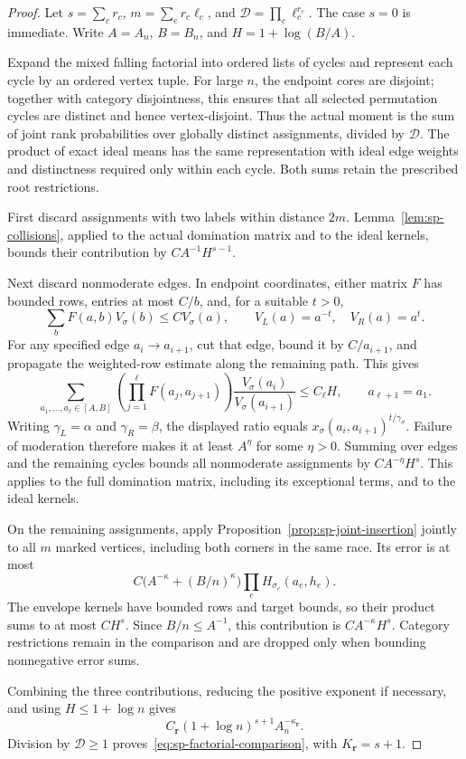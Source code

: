 \documentclass[11pt]{article}
\theoremstyle{remark}
\theoremstyle{plain}
\begin{document}
\begin{proof}
Let $s=\sum_c r_c$, $m=\sum_c r_c\ell_c$, and
$\mathcal D=\prod_c\ell_c^{r_c}$.  The case $s=0$ is immediate.
Write $A=A_n$, $B=B_n$, and $H=1+\log(B/A)$.

Expand the mixed falling factorial into ordered lists of cycles and
represent each cycle by an ordered vertex tuple.  For large $n$,
the endpoint cores are disjoint; together with category disjointness,
this ensures that all selected permutation cycles are distinct and
hence vertex-disjoint.  Thus the actual moment is the sum of joint
rank probabilities over globally distinct assignments, divided by
$\mathcal D$.  The product of exact ideal means has the same
representation with ideal edge weights and distinctness required
only within each cycle.  Both sums retain the prescribed root
restrictions.

First discard assignments with two labels within distance $2m$.
Lemma~\ref{lem:sp-collisions}, applied to the actual domination matrix
and to the ideal kernels, bounds their contribution by
$CA^{-1}H^{s-1}$.

Next discard nonmoderate edges.  In endpoint coordinates, either
matrix $F$ has bounded rows, entries at most $C/b$, and, for a
suitable $t>0$,
\[
 \sum_b F(a,b)V_\sigma(b)\le CV_\sigma(a),
 \qquad
 V_L(a)=a^{-t},\quad V_R(a)=a^t.
\]
For any specified edge $a_i\to a_{i+1}$, cut that edge, bound it by
$C/a_{i+1}$, and propagate the weighted-row estimate along the
remaining path.  This gives
\[
 \sum_{a_1,\ldots,a_\ell\in[A,B]}
 \left(\prod_{j=1}^{\ell}F(a_j,a_{j+1})\right)
 \frac{V_\sigma(a_i)}{V_\sigma(a_{i+1})}
 \le C_\ell H,
 \qquad a_{\ell+1}=a_1.
\]
Writing $\gamma_L=\alpha$ and $\gamma_R=\beta$, the displayed ratio
equals $x_\sigma(a_i,a_{i+1})^{t/\gamma_\sigma}$.
Failure of moderation therefore makes it at least $A^\eta$ for some
$\eta>0$.  Summing over edges and the remaining cycles bounds all
nonmoderate assignments by $CA^{-\eta}H^s$.  This applies to the full
domination matrix, including its exceptional terms, and to the ideal
kernels.

On the remaining assignments, apply
Proposition~\ref{prop:sp-joint-insertion} jointly to all $m$ marked
vertices, including both corners in the same race.  Its error is at
most
\[
 C\bigl(A^{-\kappa}+(B/n)^\kappa\bigr)
 \prod_e H_{\sigma_e}(a_e,h_e).
\]
The envelope kernels have bounded rows and target bounds, so their
product sums to at most $CH^s$.  Since $B/n\le A^{-1}$, this
contribution is $CA^{-\kappa}H^s$.  Category restrictions remain in
the comparison and are dropped only when bounding nonnegative
error sums.

Combining the three contributions, reducing the positive exponent
if necessary, and using $H\le1+\log n$ gives
\[
 C_{\boldsymbol r}(1+\log n)^{s+1}A_n^{-\kappa_{\boldsymbol r}}.
\]
Division by $\mathcal D\ge1$ proves~\eqref{eq:sp-factorial-comparison},
with $K_{\boldsymbol r}=s+1$.
\end{proof}
\end{document}
